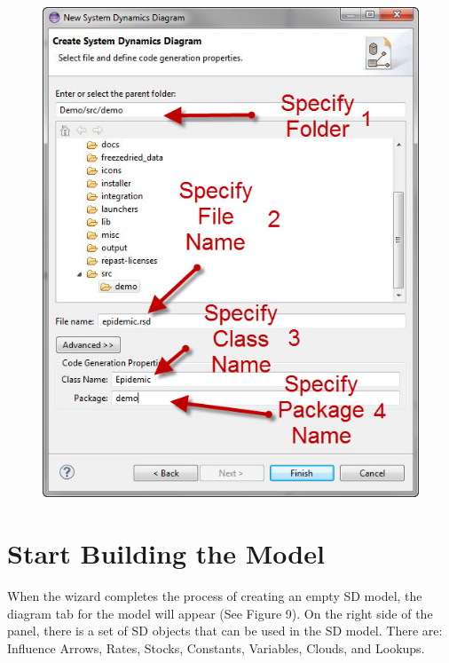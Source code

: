 \documentclass[11pt]{amsart}
\begin{document}
\begin{figure}[ht]
\begin{center}
\vspace{.2in}
\centerline {
\includegraphics[totalheight=0.35\textheight]{images/008.jpg}
}
\caption{}
\label{fig:008}
\end{center}
\end{figure}

\clearpage

\section{Start Building the Model}
When the wizard completes the process of creating an empty SD model, the diagram tab for the model will appear (See Figure 9). On the right side of the panel, there is a set of SD objects that can be used in the SD model. There are: Influence Arrows, Rates, Stocks, Constants, Variables, Clouds, and Lookups.
\end{document}

